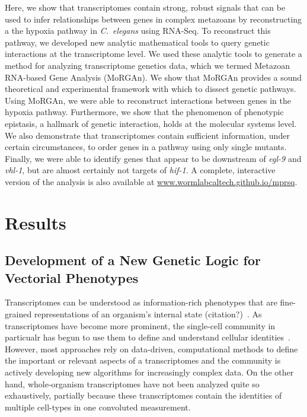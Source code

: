\documentclass[9pt,twocolumn,twoside]{pnas-new}
\newcommand{\cel}{\emph{C.~elegans}}
\newcommand{\egl}{\emph{egl-9}}
\newcommand{\vhl}{\emph{vhl-1}}
\newcommand{\hif}{\emph{hif-1}}
\begin{document}
Here, we show that transcriptomes contain strong, robust signals that can be used to infer relationships between genes in complex metazoans by reconstructing a the hypoxia pathway in \cel{} using RNA-Seq. To reconstruct this pathway, we developed new analytic mathematical tools to query genetic interactions at the transcriptome level. We used these analytic tools to generate a method for analyzing transcriptome genetics data, which we termed Metazoan RNA-based Gene Analysis (MoRGAn).
We show that MoRGAn provides a sound theoretical and experimental framework with which to dissect genetic pathways. Using MoRGAn, we were able to reconstruct interactions between genes in the hypoxia pathway.
Furthermore, we show that the phenomenon of phenotypic epistasis, a hallmark of genetic interaction, holds at the molecular systems level.
We also demonstrate that transcriptomes contain sufficient information, under certain circumstances, to order genes in a pathway using only single mutants. Finally, we were able to identify genes that appear to be downstream of \egl{} and \vhl{}, but are almost certainly not targets of \hif{}.
A complete, interactive version of the analysis is also available at \url{www.wormlabcaltech.github.io/mprsq}.

\section*{Results}
\subsection{Development of a New Genetic Logic for Vectorial Phenotypes}
\label{sec:genetic_logic}

Transcriptomes can be understood as information-rich phenotypes that are fine-grained representations of an organism's internal state (citation?)~\cite{}. As transcriptomes have become more prominent, the single-cell community in particualr has begun to use them to define and understand cellular identities~\cite{}. However, most approaches rely on data-driven, computational methods to define the important or relevant aspects of a transcriptomes and the community is actively developing new algorithms for increasingly complex data. On the other hand, whole-organism transcriptomes have not been analyzed quite so exhaustively, partially because these transcriptomes contain the identities of multiple cell-types in one convoluted measurement.
\end{document}
